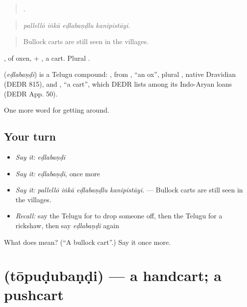 \begin{quote}
   .
\end{quote}

\begin{quote}
\emph{pallellō iṅkā eḍlabaṇḍlu kanipistāyi.}
\end{quote}

\begin{quote}
Bullock carts are still seen in the villages.
\end{quote}

, of oxen, + , a cart. Plural .

\begin{cousinweb}
\textbf{} (\emph{eḍlabaṇḍi}) is a Telugu compound: , from , \textquotedblleft{}an ox\textquotedblright{}, plural , native Dravidian (DEDR 815), and , \textquotedblleft{}a cart\textquotedblright{}, which DEDR lists among its Indo-Aryan loans (DEDR App. 50).
\end{cousinweb}

\begin{grammarlens}[title={What you've built}]
One more word for getting around.
\end{grammarlens}

\subsection*{Your turn}
\begin{itemize}
\raggedright
  \item \emph{Say it:} \emph{eḍlabaṇḍi}
  \item \emph{Say it:} \emph{eḍlabaṇḍi}, once more
  \item \emph{Say it:} \emph{pallellō iṅkā eḍlabaṇḍlu kanipistāyi.} — Bullock carts are still seen in the villages.
  \item \emph{Recall:} say the Telugu for to drop someone off, then the Telugu for a rickshaw, then say \emph{eḍlabaṇḍi} again
\end{itemize}

\begin{tcolorbox}[breakable,colback=teal!4,colframe=teal!35!black,title={Before you move on}]
What does  mean? (\textquotedblleft{}A bullock cart\textquotedblright{}.) Say it once more.
\end{tcolorbox}
\section[\texorpdfstring{\te{తోపుడుబండి} (tōpuḍubaṇḍi)}{తోపుడుబండి (tōpuḍubaṇḍi)}]{ (tōpuḍubaṇḍi) — a handcart; a pushcart}

